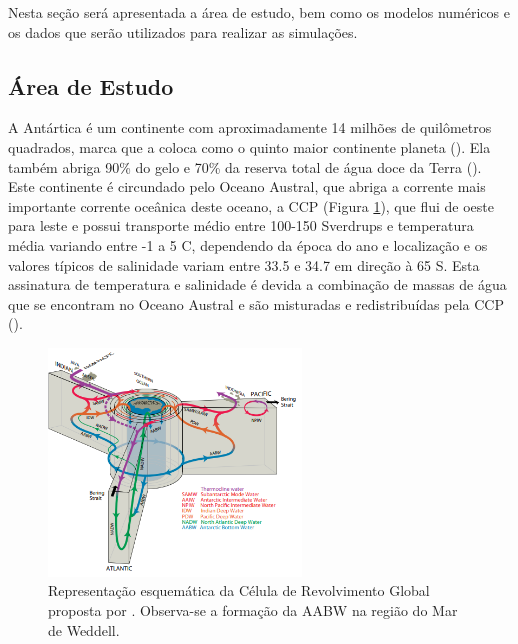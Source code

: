 \documentclass{article}
\begin{document}
Nesta seção será apresentada a área de estudo, bem como os modelos numéricos e os dados que serão utilizados para realizar as simulações.

\subsection{Área de Estudo}
\bigskip

A Antártica é um continente com aproximadamente 14 milhões de quilômetros quadrados, marca que a coloca como o quinto maior continente
planeta (\cite{NSF2019}). Ela também abriga 90\% do gelo e 70\% da reserva total de água doce da Terra (\cite{NSF2019}). Este continente 
é circundado pelo Oceano Austral, que abriga a corrente mais importante corrente oceânica deste oceano, a CCP (\textcolor{bleu_cite}{Figura \ref{meridional}}), que flui de oeste para leste
e possui transporte médio entre 100-150 Sverdrups e temperatura média variando entre -1 a 5 \textdegree{}C, dependendo da época do ano e
localização e os valores típicos de salinidade variam entre 33.5 e 34.7 em direção à 65 \textdegree{}S.
Esta assinatura de temperatura e salinidade é devida a combinação de massas de água que se encontram no Oceano Austral e são misturadas e 
redistribuídas pela CCP (\cite{Pickard1990}).
\bigskip

\begin{figure}[H]
    \centering
    \includegraphics[width=0.60\textwidth]{img/meridional.png}
	\caption{Representação esquemática da Célula de Revolvimento Global proposta por \textcite{Talley2013}. Observa-se a formação da AABW na região
	do Mar de Weddell.}
	\label{meridional}
\end{figure}
\end{document}
